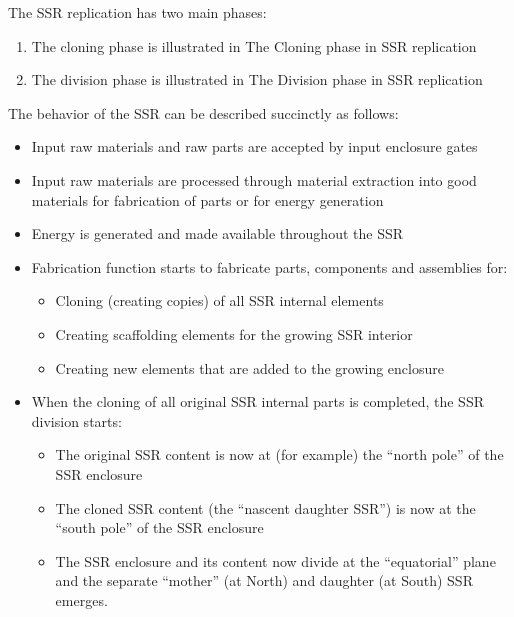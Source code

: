 
The SSR replication has two main phases:

\begin{enumerate}
\item The cloning phase is illustrated in  The Cloning phase in SSR
replication
\item The division phase is illustrated in  The Division phase in SSR
replication
\end{enumerate}



The behavior of the SSR can be described succinctly as follows:

\begin{itemize}
\item Input raw materials and raw parts are accepted by input enclosure
gates
\item Input raw materials are processed through material extraction into
good materials for fabrication of parts or for energy generation
\item Energy is generated and made available throughout the SSR
\item Fabrication function starts to fabricate parts, components and
assemblies for: 

\begin{itemize}
\item Cloning (creating copies) of all SSR internal elements
\item Creating scaffolding elements for the growing SSR interior
\item Creating new elements that are added to the growing enclosure
\end{itemize}
\item When the cloning of all original SSR internal parts is completed,
the SSR division starts:

\begin{itemize}
\item The original SSR content is now at (for example) the “north pole”
of the SSR enclosure
\item The cloned SSR content (the “nascent daughter SSR”) is now at the
“south pole” of the SSR enclosure
\item The SSR enclosure and its content now divide at the “equatorial”
plane and the separate “mother” (at North) and daughter (at South) SSR
emerges.
\end{itemize}
\end{itemize}

